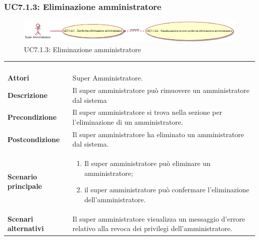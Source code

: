 \subsubsection{UC7.1.3: Eliminazione amministratore}
\label{UC7.1.3}
\begin{figure}[h]
\centering
\includegraphics[width=\textwidth,height=\textheight,keepaspectratio]{images/UseCaseUC713.png}
\caption{UC7.1.3: Eliminazione amministratore}
\end{figure}
\begin{longtable}{l|p{10cm}}
\rowcolor[gray]{0.8} \multicolumn{2}{c}{} \\
\rowcolor[gray]{0.8} \multicolumn{2}{c}{\textbf{UC7.1.3 - Eliminazione amministratore}} \\
\rowcolor[gray]{0.8} \multicolumn{2}{c}{} \\
\hline
&\\
\textbf{Attori} & Super Amministratore.\\[7pt]
\textbf{Descrizione} & Il super amministratore può rimuovere un amministratore dal sistema\\[7pt]
\textbf{Precondizione} & Il super amministratore si trova nella sezione per l'eliminazione di un amministratore.\\[7pt]
\textbf{Postcondizione} & Il super amministratore ha eliminato un amministratore dal sistema.\\[7pt]
\textbf{Scenario principale} &\begin{enumerate}
\item  Il super amministratore può eliminare un amministratore;
\item  il super amministratore può confermare l'eliminazione dell'amministratore.
\end{enumerate}
\\[7pt]
\textbf{Scenari alternativi} & Il super amministratore visualizza un messaggio d'errore relativo alla revoca dei privilegi dell'amministratore.\\[7pt]\hline
\end{longtable}

